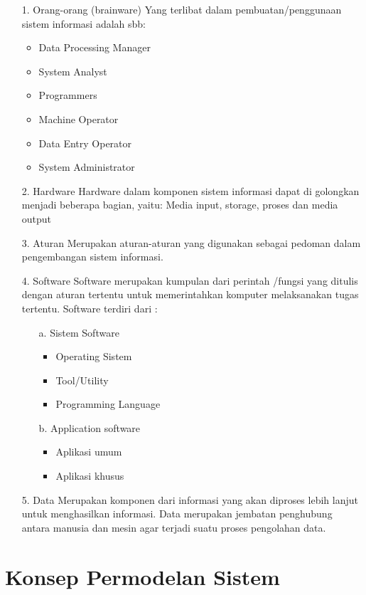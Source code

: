 \documentclass{jtetiproposalskripsi}
\begin{document}
\begin{itemize}
\item[1.] Orang-orang (brainware) 
Yang terlibat dalam pembuatan/penggunaan sistem informasi adalah sbb: 
\begin{itemize}
\item{} Data Processing Manager 
\item{} System Analyst 
\item{} Programmers 
\item{} Machine Operator 
\item{} Data Entry Operator 
\item{} System Administrator
\end{itemize}


\item[2.] Hardware 
Hardware dalam komponen sistem informasi dapat di golongkan menjadi beberapa bagian, yaitu: Media input, storage, proses dan media output 
\item[3.] Aturan 
Merupakan aturan-aturan yang digunakan sebagai pedoman dalam pengembangan sistem informasi. 
\item[4.] Software 
Software merupakan kumpulan dari perintah /fungsi yang ditulis dengan aturan tertentu untuk memerintahkan komputer melaksanakan tugas tertentu. Software terdiri dari : 
\begin{itemize}
\item[a.]	Sistem Software 
\begin{itemize}
\item{}	Operating Sistem 
\item{}	Tool/Utility 
\item{}	Programming Language 
\end{itemize}
\item[b.]	Application software 
\begin{itemize}
\item{}	Aplikasi umum 
\item{}	Aplikasi khusus 
\end{itemize}
\end{itemize}

\item[5.] Data 
Merupakan komponen dari informasi yang akan diproses lebih lanjut untuk menghasilkan informasi. Data merupakan jembatan penghubung antara manusia dan mesin agar terjadi suatu proses pengolahan data. 
\end{itemize}

\section{Konsep Permodelan Sistem}
\end{document}
